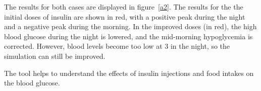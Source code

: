 \documentclass[12pt,MSc]{muthesis}
\begin{document}
The results for both cases are displayed in figure~\ref{a2}. The results for the the initial doses of insulin are shown in red, with a positive peak during the night and a negative peak during the morning. 
In the improved doses (in red), the high blood glucose during the night is lowered, and the mid-morning hypoglycemia is corrected. However, blood levels become too low at 3 in the night, so the simulation can still be improved.

The tool helps to understand the effects of insulin injections and food intakes on the blood glucose.


    
    
\end{document}
